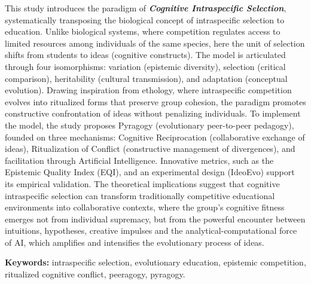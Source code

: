 \documentclass{Configuration_Files/PoliMi3i_thesis}
\begin{document}
This study introduces the paradigm of \textbf{\textit{Cognitive Intraspecific Selection}}, systematically transposing the biological concept of intraspecific selection to education.
\mbox{Unlike} biological systems, where competition regulates access to limited resources among individuals of the same species, here the unit of selection shifts from students to ideas (cognitive constructs). The model is articulated through four isomorphisms: variation (epistemic diversity), selection (critical comparison), heritability (cultural transmission), and adaptation (conceptual evolution). Drawing inspiration from ethology, where intraspecific competition evolves into ritualized forms that preserve group cohesion, the paradigm promotes constructive confrontation of ideas without penalizing individuals.
To implement the model, the study proposes Pyragogy (evolutionary peer-to-peer pedagogy), founded on three mechanisms: Cognitive Reciprocation (collaborative exchange of ideas), Ritualization of Conflict (constructive management of divergences), and facilitation through Artificial Intelligence. Innovative metrics, such as the Epistemic Quality Index (EQI), and an experimental design (IdeoEvo) support its empirical validation. The theoretical implications suggest that cognitive intraspecific selection can transform traditionally competitive educational environments into collaborative contexts, where the group's cognitive fitness emerges not from individual supremacy, but from the powerful encounter between intuitions, hypotheses, creative impulses and the analytical-computational force of AI, which amplifies and intensifies the evolutionary process of ideas.

\vspace{1cm}
\textbf{Keywords:} intraspecific selection, evolutionary education, epistemic competition,\\ ritualized cognitive conflict, peeragogy, pyragogy.


\thispagestyle{empty}
\tableofcontents %
\thispagestyle{empty}
\cleardoublepage

\mainmatter %
\end{document}
